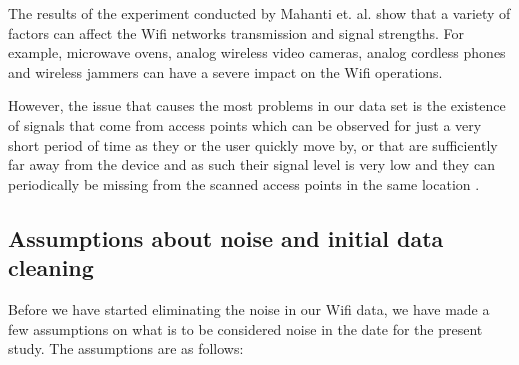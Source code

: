 The results of the experiment conducted by Mahanti et. al. \cite{MahantiCWA10}
show that a variety of factors can affect the Wifi networks transmission and
signal strengths. For example, microwave ovens, analog wireless video cameras,
analog cordless phones and wireless jammers can have a severe impact on the Wifi
operations.

However, the issue that causes the most problems in our data set is the
existence of signals that come from access points which can be observed for just
a very short period of time as they or the user quickly move by, or that are
sufficiently far away from the device and as such their signal level is very low
and they can periodically be missing from the scanned access points in the same
location \cite{fu2008wireless}. 

\subsection{Assumptions about noise and initial data cleaning}
\label{noise_assumptions}
Before we have started eliminating the noise in our Wifi data, we have made a
few assumptions on what is to be considered noise in the date for the present
study. The assumptions are as follows:
